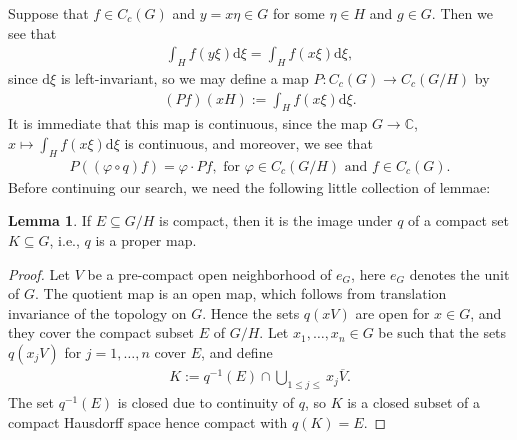 \documentclass[10pt,twoside,openany,final]{memoir}
\theoremstyle{definition}
\newtheorem{lemma}[theorem]{Lemma}
\theoremstyle{Break}
\newcommand{\C}{\mathbb{C}}
\renewcommand{\d}{\mathrm{d}}
\begin{document}
Suppose that $f \in C_c(G)$ and $y=x \eta\in G$ for some $\eta \in H$ and $g \in G$. Then we see that
\begin{align*}
	\int_H f(y \xi) \d \xi = \int_H f(x \xi) \d \xi,
\end{align*}
since $\d \xi$ is left-invariant, so we may define a map $P \colon C_c(G) \to C_c(G/H)$ by
\begin{align*}
	(Pf)(xH):= \int_{H}f(x \xi) \d \xi.
\end{align*}
It is immediate that this map is continuous, since the map $G \to \C$, $x \mapsto \int_H  f(x \xi) \d \xi$ is continuous, and moreover, we see that
\begin{align*}
	P\left( (\varphi \circ q) f \right)=\varphi\cdot Pf, \text{ for } \varphi \in C_c(G/H) \text{ and } f \in C_c(G).
\end{align*}
Before continuing our search, we need the following little collection of lemmae:
\begin{lemma}
	If $E \subseteq G/H$ is compact, then it is the image under $q$ of a compact set $K \subseteq G$, i.e., $q$ is a proper map.
	\label{2.45}
\end{lemma}
\begin{proof}
	Let $V$ be a pre-compact open neighborhood of $e_G$, here $e_G$ denotes the unit of $G$. The quotient map is an open map, which follows from translation invariance of the topology on $G$. Hence the sets $q(xV)$ are open for $x \in G$, and they cover the compact subset $E$ of $G/H$. Let $x_1,\dots,x_n \in G$ be such that the sets $q(x_jV)$ for $j=1,\dots,n$ cover $E$, and define
	\begin{align*}
		K:= q^{-1}(E) \cap \bigcup_{1 \leq j \leq}x_j \overline{V}.
	\end{align*}
	The set $q^{-1}(E)$ is closed due to continuity of $q$, so $K$ is a closed subset of a compact Hausdorff space hence compact with $q(K)=E$.	
\end{proof}
\end{document}
